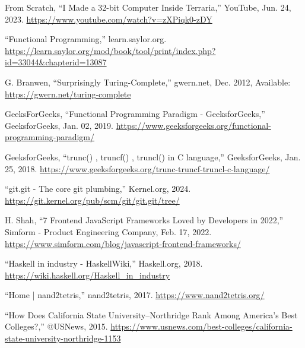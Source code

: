\documentclass[12pt]{report} %
\begin{document}
\begin{singlespace}
\begin{thebibliography}{}
             From Scratch, “I Made a 32-bit Computer Inside Terraria,” YouTube, Jun. 24, 2023. \href{https://www.youtube.com/watch?v=zXPiqk0-zDY}{https://www.youtube.com/watch?v=zXPiqk0-zDY}
            
             “Functional Programming,” learn.saylor.org. \href{https://learn.saylor.org/mod/book/tool/print/index.php?id=33044&chapterid=13087}{https://learn.saylor.org/mod/book/tool/print/\-index.php?id=33044\&chapterid=13087}
            
             G. Branwen, “Surprisingly Turing-Complete,” gwern.net, Dec. 2012, Available: \href{https://gwern.net/turing-complete}{https://gwern.net/turing-complete}
            
             GeeksForGeeks, “Functional Programming Paradigm - GeeksforGeeks,” GeeksforGeeks, Jan. 02, 2019. \href{https://www.geeksforgeeks.org/functional-programming-paradigm/}{https://www.geeksforgeeks.org/functional-programming-paradigm/}
            
             GeeksforGeeks, “trunc() , truncf() , truncl() in C language,” GeeksforGeeks, Jan. 25, 2018. \href{https://www.geeksforgeeks.org/trunc-truncf-truncl-c-language/}{https://www.geeksforgeeks.org/trunc-truncf-truncl-c-language/}
            
             “git.git - The core git plumbing,” Kernel.org, 2024. \href{https://git.kernel.org/pub/scm/git/git.git/tree/}{https://git.kernel.org/pub/scm/git/git.git/tree/}
            
             H. Shah, “7 Frontend JavaScript Frameworks Loved by Developers in 2022,” Simform - Product Engineering Company, Feb. 17, 2022. \href{https://www.simform.com/blog/javascript-frontend-frameworks/}{https://www.simform.com/blog/javascript-frontend-frameworks/}
            
             “Haskell in industry - HaskellWiki,” Haskell.org, 2018. \href{https://wiki.haskell.org/Haskell\_in\_industry}{https://wiki.haskell.org/Haskell\_in\_industry}
            
             “Home | nand2tetris,” nand2tetris, 2017. \href{https://www.nand2tetris.org/}{https://www.nand2tetris.org/}
            
             “How Does California State University--Northridge Rank Among America’s Best Colleges?,” @USNews, 2015. \href{https://www.usnews.com/best-colleges/california-state-university-northridge-1153}{https://www.usnews.com/best-colleges/california-state-university-northridge-1153}
            

\end{thebibliography}
\end{singlespace}
\end{document}
